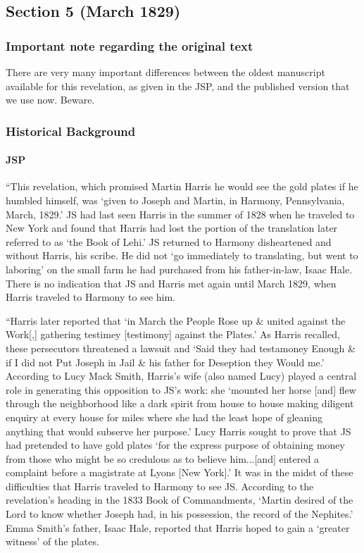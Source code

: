 \subsection{Section 5 (March 1829)}
	\label{DC5}
	
	\subsubsection{Important note regarding the original text}
	
		There are very many important differences between the oldest manuscript available for this revelation, as given in the JSP, and the published version that we use now. Beware.
	
	\subsubsection{Historical Background}
		\label{DC5-HB}
		
		\paragraph{JSP}
		
			``This revelation, which promised Martin Harris he would see the gold plates if he humbled himself, was `given to Joseph and Martin, in Harmony, Pennsylvania, March, 1829.' JS had last seen Harris in the summer of 1828 when he traveled to New York and found that Harris had lost the portion of the translation later referred to as `the Book of Lehi.' JS returned to Harmony disheartened and without Harris, his scribe. He did not `go immediately to translating, but went to laboring' on the small farm he had purchased from his father-in-law, Isaac Hale. There is no indication that JS and Harris met again until March 1829, when Harris traveled to Harmony to see him.
			
			``Harris later reported that `in March the People Rose up \& united against the Work[,] gathering testimey [testimony] against the Plates.' As Harris recalled, these persecutors threatened a lawsuit and `Said they had testamoney Enough \& if I did not Put Joseph in Jail \& his father for Deseption they Would me.' According to Lucy Mack Smith, Harris's wife (also named Lucy) played a central role in generating this opposition to JS's work: she `mounted her horse [and] flew through the neighborhood like a dark spirit from house to house making diligent enquiry at every house for miles where she had the least hope of gleaning anything that would subserve her purpose.' Lucy Harris sought to prove that JS had pretended to have gold plates `for the express purpose of obtaining money from those who might be so credulous as to believe him...[and] entered a complaint before a magistrate at Lyons [New York].' It was in the midst of these difficulties that Harris traveled to Harmony to see JS. According to the revelation's heading in the 1833 Book of Commandments, `Martin desired of the Lord to know whether Joseph had, in his possession, the record of the Nephites.' Emma Smith's father, Isaac Hale, reported that Harris hoped to gain a `greater witness' of the plates.
			
